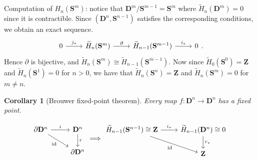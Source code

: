 \documentclass[11pt]{article}
\theoremstyle{definition}
\theoremstyle{plain}
\newtheorem*{corollary}{Corollary}
\theoremstyle{remark}
\newcommand{\id}{\textrm{id}}
\newcommand{\Z}{\mathbf{Z}}
\begin{document}
Computation of $H_n(\mathbf{S}^m)$: notice that $\mathbf{D}^m/\mathbf{S}^{m-1}=\mathbf{S}^m$ where $\widetilde{H}_n(\mathbf{D}^m)=0$ since it is contractible. Since $(\mathbf{D}^n,\mathbf{S}^{n-1})$ satisfies the corresponding conditions, we obtain an exact sequence.
\[\begin{tikzcd}
0\arrow{r}{j_\ast}&\widetilde{H}_n(\mathbf{S}^m)\arrow{r}{\partial}&\widetilde{H}_{n-1}(\mathbf{S}^{m-1})\arrow{r}{i_\ast}&0
\end{tikzcd}.\]
Hence $\partial$ is bijective, and $\widetilde{H}_n(\mathbf{S}^m)\cong\widetilde{H}_{n-1}(\mathbf{S}^{m-1})$. Now since $\widetilde{H}_0(\mathbf{S}^0)=\Z$ and $\widetilde{H}_n(\mathbf{S}^1)=0$ for $n>0$, we have that $\widetilde{H}_n(\mathbf{S}^n)=\Z$ and $\widetilde{H}_n(\mathbf{S}^m)=0$ for $m\neq n$.

\begin{corollary}[Brouwer fixed-point theorem]
Every map $f:\mathbf{D}^n\to\mathbf{D}^n$ has a fixed point.
\end{corollary}
\[\begin{tikzcd}
\partial\mathbf{D}^n\arrow[swap]{dr}{\id}\arrow{r}{i}&\mathbf{D}^n\arrow{d}{r}\\
&\partial\mathbf{D}^n
\end{tikzcd}\Longrightarrow\begin{tikzcd}
\widetilde{H}_{n-1}(\mathbf{S}^{n-1})\cong\Z\arrow[swap]{dr}{\id}\arrow{r}{i_\ast}&\widetilde{H}_{n-1}(\mathbf{D}^n)\cong0\arrow{d}{r_\ast}\\
&\Z
\end{tikzcd}\]
\end{document}
